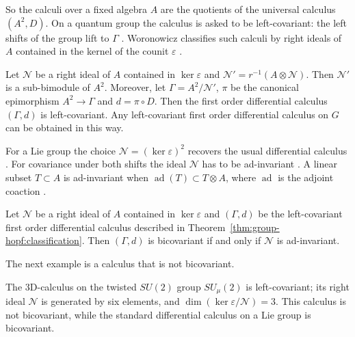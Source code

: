 So the calculi over a fixed algebra $A$ are the quotients of the universal calculus
$(A^2,D)$. On a quantum group the calculus is asked to be left-covariant: the left
shifts of the group lift to $\Gamma$ \cite[p.~132]{Woronowicz1989}. Woronowicz
classifies such calculi by right ideals of $A$ contained in the kernel of the counit
$\varepsilon$ \cite[p.~132]{Woronowicz1989}.

\begin{theorem}\label{thm:group-hopf:classification}
Let $\mathcal{N}$ be a right ideal of $A$ contained in $\ker\varepsilon$ and
$\mathcal{N}'=r^{-1}(A\otimes\mathcal{N})$. Then $\mathcal{N}'$ is a sub-bimodule of
$A^2$. Moreover, let $\Gamma=A^2/\mathcal{N}'$, $\pi$ be the canonical epimorphism
$A^2\to\Gamma$ and $d=\pi\circ D$. Then the first order differential calculus
$(\Gamma,d)$ is left-covariant. Any left-covariant first order differential calculus
on $G$ can be obtained in this way.
\end{theorem}

For a Lie group the choice $\mathcal{N}=(\ker\varepsilon)^2$ recovers the usual
differential calculus \cite[p.~132]{Woronowicz1989}. For covariance under both
shifts the ideal $\mathcal{N}$ has to be ad-invariant
\cite[p.~134]{Woronowicz1989}. A linear subset $T\subset A$ is ad-invariant when
$\operatorname{ad}(T)\subset T\otimes A$, where $\operatorname{ad}$ is the adjoint
coaction \cite[p.~133]{Woronowicz1989}.

\begin{theorem}\label{thm:group-hopf:bicovariant}
Let $\mathcal{N}$ be a right ideal of $A$ contained in $\ker\varepsilon$ and
$(\Gamma,d)$ be the left-covariant first order differential calculus described in
Theorem~\ref{thm:group-hopf:classification}. Then $(\Gamma,d)$ is bicovariant if and
only if $\mathcal{N}$ is ad-invariant.
\end{theorem}

The next example is a calculus that is not bicovariant.

\begin{example}\label{ex:group-hopf:3d}
The 3D-calculus on the twisted $SU(2)$ group $SU_\mu(2)$ is left-covariant; its
right ideal $\mathcal{N}$ is generated by six elements, and
$\dim(\ker\varepsilon/\mathcal{N})=3$. This calculus is not bicovariant, while the
standard differential calculus on a Lie group is bicovariant.
\end{example}

